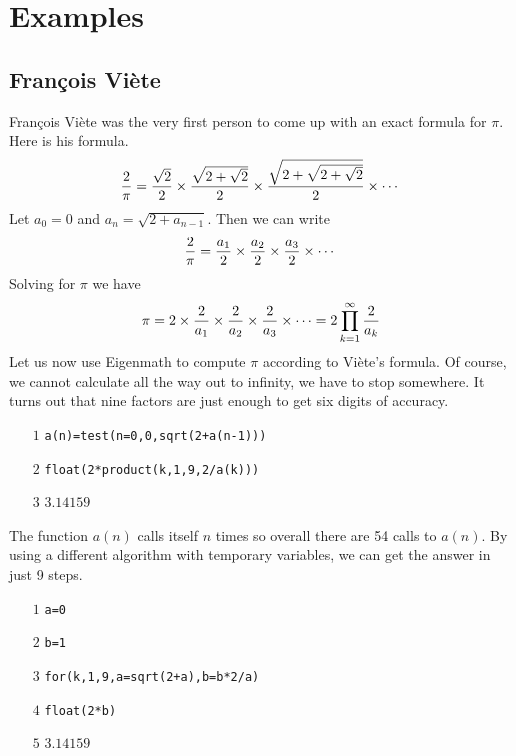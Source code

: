 \documentclass[12pt,openany]{report}
\begin{document}
\chapter{Examples}

\newpage

\section*{Fran\c cois Vi\`ete}
Fran\c cois Vi\`ete was the very first person to come up with an exact formula for $\pi$.
Here is his formula.
\begin{displaymath}
{2\over\pi}={\sqrt2\over2}\times{\sqrt{2+\sqrt2}\over2}\times
{\sqrt{2+\sqrt{2+\sqrt2}}\over2}\times\cdots
\end{displaymath}
Let $a_0=0$ and $a_{n}=\sqrt{2+a_{n-1}}$.
Then we can write
\begin{displaymath}
{2\over\pi}={a_1\over2}\times{a_2\over2}\times
{a_3\over2}\times\cdots
\end{displaymath}
%
Solving for $\pi$ we have
\begin{displaymath}
\pi=2\times{2\over a_1}\times{2\over a_2}\times{2\over a_3}\times\cdots=2\prod_{k=1}^\infty
{2\over a_k}
\end{displaymath}
%
Let us now use Eigenmath to compute $\pi$ according to Vi\`ete's formula.
Of course, we cannot calculate all the way out to infinity, we have to stop somewhere.
It turns out that nine factors are just enough to get six digits of accuracy.
\begin{itemize}
\item[$\scriptstyle1$]{\tt a(n)=test(n=0,0,sqrt(2+a(n-1)))}
\item[$\scriptstyle2$]{\tt float(2*product(k,1,9,2/a(k)))}
\item[$\scriptstyle3$]\hspace{50pt} $3.14159$
\end{itemize}
The function $a(n)$ calls itself $n$ times so overall there are
54 calls to $a(n)$.
By using a different algorithm with temporary variables, we can get the answer in just 9 steps.
\begin{itemize}
\item[$\scriptstyle1$]{\tt a=0}
\item[$\scriptstyle2$]{\tt b=1}
\item[$\scriptstyle3$]{\tt for(k,1,9,a=sqrt(2+a),b=b*2/a)}
\item[$\scriptstyle4$]{\tt float(2*b)}
\item[$\scriptstyle5$]\hspace{50pt} $3.14159$
\end{itemize}
\end{document}
